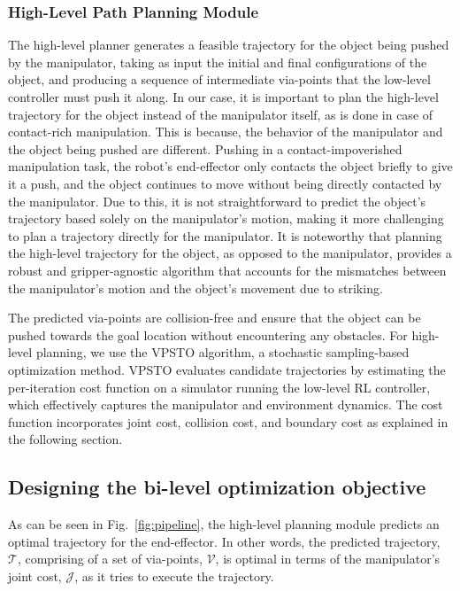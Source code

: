 \subsubsection{High-Level Path Planning Module}
\label{sec:path-planning-module}
The high-level planner generates a feasible trajectory for the object being pushed by the manipulator, taking as input the initial and final configurations of the object, and producing a sequence of intermediate via-points that the low-level controller must push it along. In our case, it is important to plan the high-level trajectory for the object instead of the manipulator itself, as is done in case of contact-rich manipulation. This is because, the behavior of the manipulator and the object being pushed are different. Pushing in a contact-impoverished manipulation task, the robot's end-effector only contacts the object briefly to give it a push, and the object continues to move without being directly contacted by the manipulator. Due to this, it is not straightforward to predict the object's trajectory based solely on the manipulator's motion, making it more challenging to plan a trajectory directly for the manipulator. It is noteworthy that planning the high-level trajectory for the object, as opposed to the manipulator, provides a robust and gripper-agnostic algorithm that accounts for the mismatches between the manipulator's motion and the object's movement due to striking.

The predicted via-points are collision-free and ensure that the object can be pushed towards the goal location without encountering any obstacles. For high-level planning, we use the VPSTO algorithm, a stochastic sampling-based optimization method. VPSTO evaluates candidate trajectories by estimating the per-iteration cost function on a simulator running the low-level RL controller, which effectively captures the manipulator and environment dynamics. The cost function incorporates joint cost, collision cost, and boundary cost as explained in the following section.

\subsection{Designing the bi-level optimization objective}

As can be seen in Fig.~\ref{fig:pipeline}, the high-level planning module predicts an optimal trajectory for the end-effector. In other words, the predicted trajectory, $\mathcal{T}$, comprising of a set of via-points, $\mathcal{V}$, is optimal in terms of the manipulator's joint cost, $\mathcal{J}$, as it tries to execute the trajectory. 

